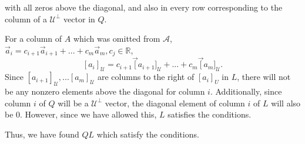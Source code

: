 \documentclass[12pt]{exam}
\newcommand{\reals}{\mathbb{R}}
\begin{document}
\begin{questions}
\begin{parts}
\begin{solution}
				with all zeros above the diagonal, and also in every row corresponding to the column of a $\mathcal U^\perp$ vector in $Q$.
				\par For a column of $A$ which was omitted from $\mathcal A$, $\vec a_i = c_{i+1} \vec a_{i+1} + ... + c_m \vec a_m, c_j \in \reals$,
				\[ [a_i]_\mathcal U = c_{i+1} \vec [a_{i+1}]_\mathcal U + ... + c_m \vec [a_m]_\mathcal U. \]
				Since $[a_{i+1}]_\mathcal U,  ... [a_m]_\mathcal U$ are columns to the right of $[a_i]_U$ in $L$, there will not be any nonzero elements above the diagonal for column $i$. Additionally, since column $i$ of $Q$ will be a $\mathcal U^\perp$ vector, the diagonal element of column $i$ of $L$ will also be 0. However, since we have allowed this, $L$ satisfies the conditions.
				\par Thus, we have found $QL$ which satisfy the conditions.
			\end{solution}
	\end{parts}
\end{questions}
\end{document}
